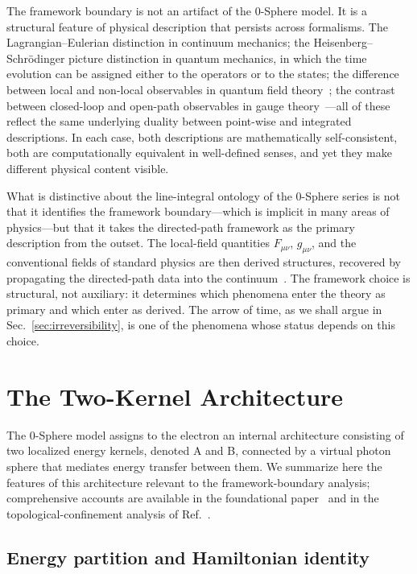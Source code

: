 \documentclass[%
 reprint, amsmath,amssymb, aps, prb, ]{revtex4-2}
\numberwithin{equation}{section}
\begin{document}
The framework boundary is not an artifact of the 0-Sphere model. It is a structural feature of physical description that persists across formalisms. The Lagrangian--Eulerian distinction in continuum mechanics; the Heisenberg--Schr\"odinger picture distinction in quantum mechanics, in which the time evolution can be assigned either to the operators or to the states; the difference between local and non-local observables in quantum field theory~\cite{Mandelstam1968, Polyakov1979}; the contrast between closed-loop and open-path observables in gauge theory~\cite{WuYang1975}---all of these reflect the same underlying duality between point-wise and integrated descriptions. In each case, both descriptions are mathematically self-consistent, both are computationally equivalent in well-defined senses, and yet they make different physical content visible.

What is distinctive about the line-integral ontology of the 0-Sphere series is not that it identifies the framework boundary---which is implicit in many areas of physics---but that it takes the directed-path framework as the primary description from the outset. The local-field quantities $F_{\mu\nu}$, $g_{\mu\nu}$, and the conventional fields of standard physics are then derived structures, recovered by propagating the directed-path data into the continuum~\cite{hanamura55}. The framework choice is structural, not auxiliary: it determines which phenomena enter the theory as primary and which enter as derived. The arrow of time, as we shall argue in Sec.~\ref{sec:irreversibility}, is one of the phenomena whose status depends on this choice.


\section{The Two-Kernel Architecture}
\label{sec:twokernel}

The 0-Sphere model assigns to the electron an internal architecture consisting of two localized energy kernels, denoted A and B, connected by a virtual photon sphere that mediates energy transfer between them. We summarize here the features of this architecture relevant to the framework-boundary analysis; comprehensive accounts are available in the foundational paper~\cite{hanamura01} and in the topological-confinement analysis of Ref.~\cite{hanamura33}.

\subsection{Energy partition and Hamiltonian identity}
\label{sec:energy_partition}
\end{document}

